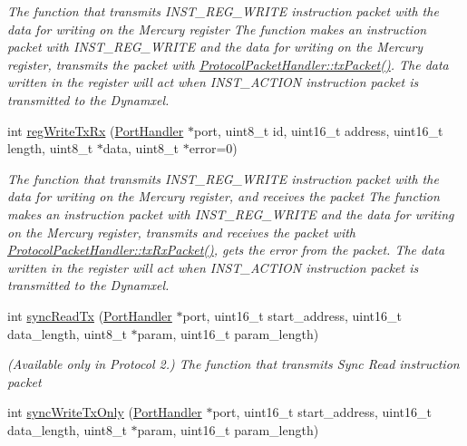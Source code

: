 \begin{DoxyCompactItemize}
\begin{DoxyCompactList}\small\item\em The function that transmits I\+N\+S\+T\+\_\+\+R\+E\+G\+\_\+\+W\+R\+I\+TE instruction packet with the data for writing on the Mercury register  The function makes an instruction packet with I\+N\+S\+T\+\_\+\+R\+E\+G\+\_\+\+W\+R\+I\+TE and the data for writing on the Mercury register,  transmits the packet with \hyperlink{classmercury_1_1_protocol_packet_handler_a245f01395d9684bc58788e8a06de3ffc}{Protocol\+Packet\+Handler\+::tx\+Packet()}.  The data written in the register will act when I\+N\+S\+T\+\_\+\+A\+C\+T\+I\+ON instruction packet is transmitted to the Dynamxel. \end{DoxyCompactList}\item 
int \hyperlink{classmercury_1_1_protocol_packet_handler_a314845a3e5d2030e56db2739310ad117}{reg\+Write\+Tx\+Rx} (\hyperlink{classmercury_1_1_port_handler}{Port\+Handler} $\ast$port, uint8\+\_\+t id, uint16\+\_\+t address, uint16\+\_\+t length, uint8\+\_\+t $\ast$data, uint8\+\_\+t $\ast$error=0)
\begin{DoxyCompactList}\small\item\em The function that transmits I\+N\+S\+T\+\_\+\+R\+E\+G\+\_\+\+W\+R\+I\+TE instruction packet with the data for writing on the Mercury register, and receives the packet  The function makes an instruction packet with I\+N\+S\+T\+\_\+\+R\+E\+G\+\_\+\+W\+R\+I\+TE and the data for writing on the Mercury register,  transmits and receives the packet with \hyperlink{classmercury_1_1_protocol_packet_handler_a68b02f23af616886d0795ea12debd613}{Protocol\+Packet\+Handler\+::tx\+Rx\+Packet()},  gets the error from the packet.  The data written in the register will act when I\+N\+S\+T\+\_\+\+A\+C\+T\+I\+ON instruction packet is transmitted to the Dynamxel. \end{DoxyCompactList}\item 
int \hyperlink{classmercury_1_1_protocol_packet_handler_af742b8964f4a2fed30b268a8c6434652}{sync\+Read\+Tx} (\hyperlink{classmercury_1_1_port_handler}{Port\+Handler} $\ast$port, uint16\+\_\+t start\+\_\+address, uint16\+\_\+t data\+\_\+length, uint8\+\_\+t $\ast$param, uint16\+\_\+t param\+\_\+length)
\begin{DoxyCompactList}\small\item\em (Available only in Protocol 2.) The function that transmits Sync Read instruction packet \end{DoxyCompactList}\item 
int \hyperlink{classmercury_1_1_protocol_packet_handler_a4a08a338c48d6c9ef42183ca74297dce}{sync\+Write\+Tx\+Only} (\hyperlink{classmercury_1_1_port_handler}{Port\+Handler} $\ast$port, uint16\+\_\+t start\+\_\+address, uint16\+\_\+t data\+\_\+length, uint8\+\_\+t $\ast$param, uint16\+\_\+t param\+\_\+length)

\end{DoxyCompactItemize}
